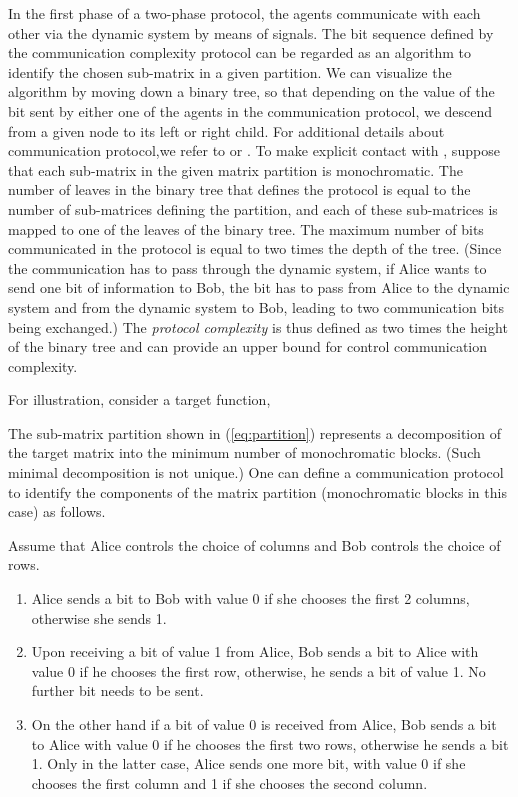 \documentclass[12pt,onecolumn,draftcls]{IEEEtran}
\begin{document}
In the first phase of a two-phase protocol, the agents communicate with each other via the dynamic system
by means of  signals.  The bit sequence defined by the communication complexity
protocol can be regarded as an algorithm to identify the chosen sub-matrix in a given
partition.  We can visualize the algorithm by moving down a binary tree,
so that depending on the value of the bit sent by either one of the agents in the
communication protocol, we descend from a given node to its left or right child.   For additional details about communication protocol,we refer to \cite{KN} or \cite{Wong}.  To make explicit contact with \cite{KN}, suppose that each sub-matrix in the given matrix partition is monochromatic.  The number of leaves in the binary tree that defines the protocol is equal to the number of sub-matrices defining the partition, and each of these sub-matrices is mapped to one of the leaves of the binary tree.  The maximum number of bits communicated in the protocol is equal to two times the depth of the tree.   (Since the communication has to pass through the dynamic system, if Alice wants to send one bit of information to Bob, the bit has to pass from Alice to the dynamic system and from the dynamic system to Bob, leading to two communication bits being exchanged.)  The {\em protocol complexity} is thus defined as two times the height of the binary tree and can provide an upper bound for control communication complexity. 

For illustration, consider a target function,

The sub-matrix partition shown in (\ref{eq:partition}) represents a decomposition of the target matrix
into the minimum number of monochromatic blocks.  (Such minimal decomposition is not unique.)
One can define a communication protocol to identify the components of the matrix partition (monochromatic blocks in this case) as follows.  

\bigskip
{} Assume that Alice controls the choice of columns and Bob controls
the choice of rows.

\begin{enumerate}
\item Alice sends a bit to Bob with value 0 if she chooses the first 2 columns, otherwise she sends 1.
\item Upon receiving a bit of value 1 from Alice, Bob sends a bit to Alice with value 0 if he chooses
the first row, otherwise, he sends a bit of value 1.  No further bit needs to be sent.
\item On the other hand if a bit of value 0 is received from Alice, Bob sends a bit to Alice with
value 0 if he chooses the first two rows, otherwise he sends a bit 1.  Only in the latter case, Alice sends
one more bit, with value 0 if she chooses the first column and 1 if she chooses the second column.
\end{enumerate}
\end{document}
